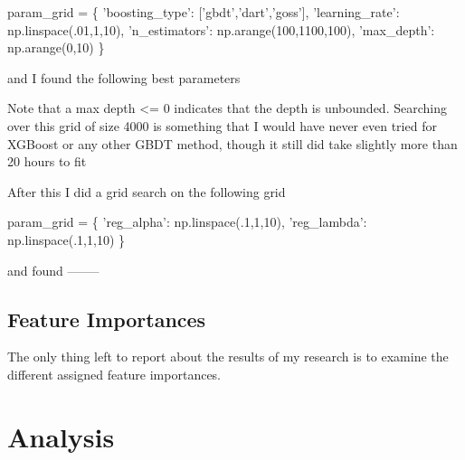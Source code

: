 \documentclass[11pt]{article}
\newenvironment{Shaded}{}{}
\newcommand{\DecValTok}[1]{\textcolor[rgb]{0.25,0.63,0.44}{{#1}}}
\newcommand{\StringTok}[1]{\textcolor[rgb]{0.25,0.44,0.63}{{#1}}}
\newcommand{\NormalTok}[1]{{#1}}
\newcommand{\OperatorTok}[1]{\textcolor[rgb]{0.40,0.40,0.40}{{#1}}}
\begin{document}
\begin{Shaded}
\begin{Highlighting}[]
\NormalTok{param_grid }\OperatorTok{=}\NormalTok{ \{}
    \StringTok{'boosting_type'}\NormalTok{: [}\StringTok{'gbdt'}\NormalTok{,}\StringTok{'dart'}\NormalTok{,}\StringTok{'goss'}\NormalTok{],}
    \StringTok{'learning_rate'}\NormalTok{: np.linspace(.}\DecValTok{01}\NormalTok{,}\DecValTok{1}\NormalTok{,}\DecValTok{10}\NormalTok{),}
    \StringTok{'n_estimators'}\NormalTok{: np.arange(}\DecValTok{100}\NormalTok{,}\DecValTok{1100}\NormalTok{,}\DecValTok{100}\NormalTok{),}
    \StringTok{'max_depth'}\NormalTok{: np.arange(}\DecValTok{0}\NormalTok{,}\DecValTok{10}\NormalTok{)}
\NormalTok{\}}
\end{Highlighting}
\end{Shaded}

and I found the following best parameters

    Note that a max depth \textless{}= 0 indicates that the depth is
unbounded. Searching over this grid of size 4000 is something that I
would have never even tried for XGBoost or any other GBDT method, though
it still did take slightly more than 20 hours to fit

After this I did a grid search on the following grid

\begin{Shaded}
\begin{Highlighting}[]
\NormalTok{param_grid }\OperatorTok{=}\NormalTok{ \{}
    \StringTok{'reg_alpha'}\NormalTok{: np.linspace(.}\DecValTok{1}\NormalTok{,}\DecValTok{1}\NormalTok{,}\DecValTok{10}\NormalTok{),}
    \StringTok{'reg_lambda'}\NormalTok{: np.linspace(.}\DecValTok{1}\NormalTok{,}\DecValTok{1}\NormalTok{,}\DecValTok{10}\NormalTok{)}
\NormalTok{\}}
\end{Highlighting}
\end{Shaded}

and found --------

    \hypertarget{feature-importances}{%
\subsection{Feature Importances}\label{feature-importances}}

The only thing left to report about the results of my research is to
examine the different assigned feature importances.

    \hypertarget{analysis}{%
\section{Analysis}\label{analysis}}
\end{document}
